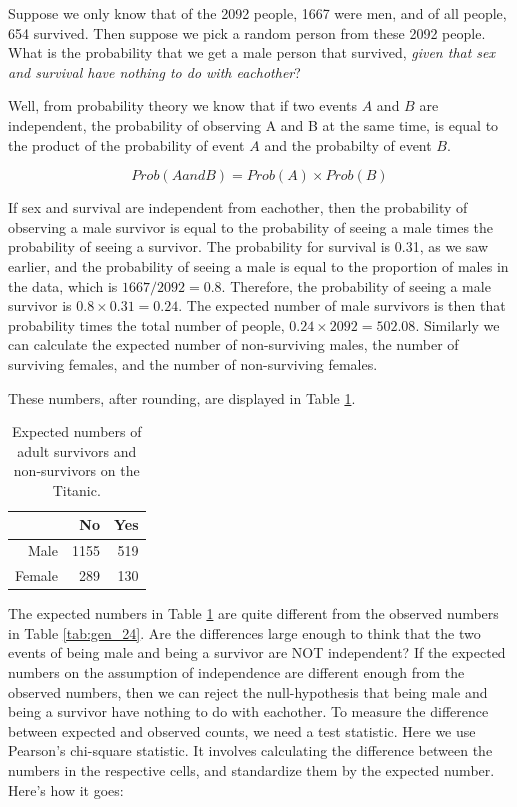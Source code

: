 \documentclass[]{book}\usepackage[]{graphicx}\usepackage[]{color}
\begin{document}
Suppose we only know that of the 2092 people, 1667 were men, and of all people, 654 survived. Then suppose we pick a random person from these 2092 people. What is the probability that we get a male person that survived, \textit{given that sex and survival have nothing to do with eachother}?

Well, from probability theory we know that if two events $A$ and $B$ are independent, the probability of observing A and B at the same time, is equal to the product of the probability of event $A$ and the probabilty of event $B$.

\begin{equation}
Prob(A and B) = Prob(A) \times Prob(B)
\end{equation}

If sex and survival are independent from eachother, then the probability of observing a male survivor is equal to the probability of seeing a male times the probability of seeing a survivor. The probability for survival is 0.31, as we saw earlier, and the probability of seeing a male is equal to the proportion of males in the data, which is $1667/2092 =0.8$. Therefore, the probability of seeing a male survivor is $0.8 \times 0.31 =0.24 $. The expected number of male survivors is then that probability times the total number of people, $0.24 \times 2092= 502.08$. Similarly we can calculate the expected number of non-surviving males, the number of surviving females, and the number of non-surviving females.


These numbers, after rounding, are displayed in Table \ref{tab:gen_27}.


\begin{table}[ht]
\centering
\caption{Expected numbers of adult survivors and non-survivors on the Titanic.} 
\label{tab:gen_27}
\begin{tabular}{rrr}
  \hline
 & No & Yes \\ 
  \hline
Male & 1155 & 519 \\ 
  Female & 289 & 130 \\ 
   \hline
\end{tabular}
\end{table}



The expected numbers in Table \ref{tab:gen_27} are quite different from the observed numbers in Table \ref{tab:gen_24}. Are the differences large enough to think that the two events of being male and being a survivor are NOT independent? If the expected numbers on the assumption of independence are different enough from the observed numbers, then we can reject the null-hypothesis that being male and being a survivor have nothing to do with eachother. To measure the difference between expected and observed counts, we need a test statistic. Here we use Pearson's chi-square statistic. It involves calculating the difference between the numbers in the respective cells, and standardize them by the expected number. Here's how it goes:
\end{document}
